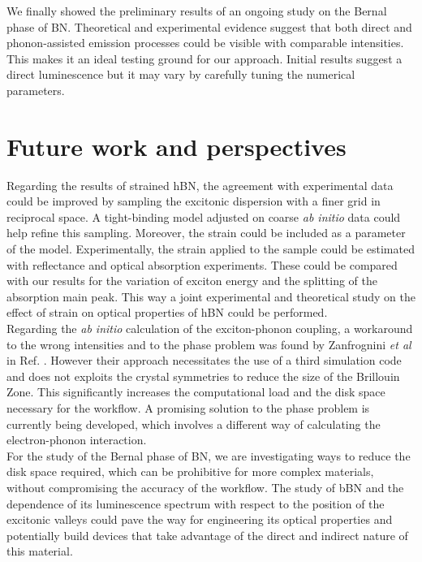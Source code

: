 We finally showed the preliminary results of an ongoing study on the Bernal phase of BN. Theoretical and experimental evidence suggest that both direct and phonon-assisted emission processes could be visible with comparable intensities. This makes it an ideal testing ground for our approach. Initial results suggest a direct luminescence but it may vary by carefully tuning the numerical parameters.

\section*{Future work and perspectives}
Regarding the results of strained \acrshort{hBN}, the agreement with experimental data could be improved by sampling the excitonic dispersion with a finer grid in reciprocal space. A tight-binding model adjusted on coarse \textit{ab initio} data could help refine this sampling. Moreover, the strain could be included as a parameter of the model. Experimentally, the strain applied to the sample could be estimated with reflectance and optical absorption experiments. These could be compared with our results for the variation of exciton energy and the splitting of the absorption main peak. This way a joint experimental and theoretical study on the effect of strain on optical properties of \acrshort{hBN} could be performed. \\

Regarding the \textit{ab initio} calculation of the exciton-phonon coupling, a workaround to the wrong intensities and to the phase problem was found by Zanfrognini \textit{et al} in Ref. \cite{zanfrognini2023distinguishing}. However their approach necessitates the use of a third simulation code and does not exploits the crystal symmetries to reduce the size of the Brillouin Zone. This significantly increases the computational load and the disk space necessary for the workflow. A promising solution to the phase problem is currently being developed, which involves a different way of calculating the electron-phonon interaction.\\

For the study of the Bernal phase of BN, we are investigating ways to reduce the disk space required, which can be prohibitive for more complex materials, without compromising the accuracy of the workflow. The study of \acrshort{bBN} and the dependence of its luminescence spectrum with respect to the position of the excitonic valleys could pave the way for engineering its optical properties and potentially build devices that take advantage of the direct and indirect nature of this material.\\ 

